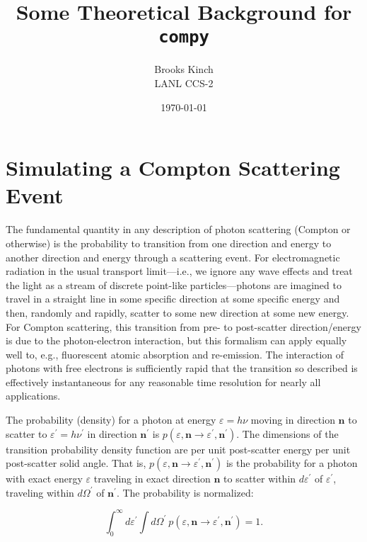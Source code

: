 \documentclass[letterpaper]{article}
\title{Some Theoretical Background for \texttt{compy}}
\author{Brooks Kinch \\ LANL CCS-2}
\date{\today}
\begin{document}
\maketitle

\section*{Simulating a Compton Scattering Event}

The fundamental quantity in any description of photon scattering (Compton or otherwise) is the probability to transition from one direction and energy to another direction and energy through a scattering event. For electromagnetic radiation in the usual transport limit---i.e., we ignore any wave effects and treat the light as a stream of discrete point-like particles---photons are imagined to travel in a straight line in some specific direction at some specific energy and then, randomly and rapidly, scatter to some new direction at some new energy. For Compton scattering, this transition from pre- to post-scatter direction/energy is due to the photon-electron interaction, but this formalism can apply equally well to, e.g., fluorescent atomic absorption and re-emission. The interaction of photons with free electrons is sufficiently rapid that the transition so described is effectively instantaneous for any reasonable time resolution for nearly all applications.


The probability (density) for a photon at energy $\varepsilon = h\nu$ moving in direction $\mathbf{n}$ to scatter to $\varepsilon^\prime = h \nu^\prime$ in direction $\mathbf{n^\prime}$ is $p(\varepsilon, \mathbf{n} \to \varepsilon^\prime, \mathbf{n^\prime})$. The dimensions of the transition probability density function are per unit post-scatter energy per unit post-scatter solid angle. That is, $p(\varepsilon, \mathbf{n} \to \varepsilon^\prime, \mathbf{n^\prime})$ is the probability for a photon with exact energy $\varepsilon$ traveling in exact direction $\mathbf{n}$ to scatter within $d \varepsilon^\prime$ of $\varepsilon^\prime$, traveling within $d \Omega^\prime$ of $\mathbf{n^\prime}$. The probability is normalized:

\begin{equation}
\int_0^\infty d\varepsilon^\prime \int d\Omega^\prime \ p(\varepsilon, \mathbf{n} \to \varepsilon^\prime, \mathbf{n^\prime}) = 1.
\end{equation}
\end{document}
